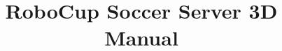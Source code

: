 \documentclass[a4paper,11pt]{scrartcl}
\begin{document}
\title{RoboCup Soccer Server 3D Manual}

\maketitle

\tableofcontents
\clearpage






\clearpage


\end{document}
